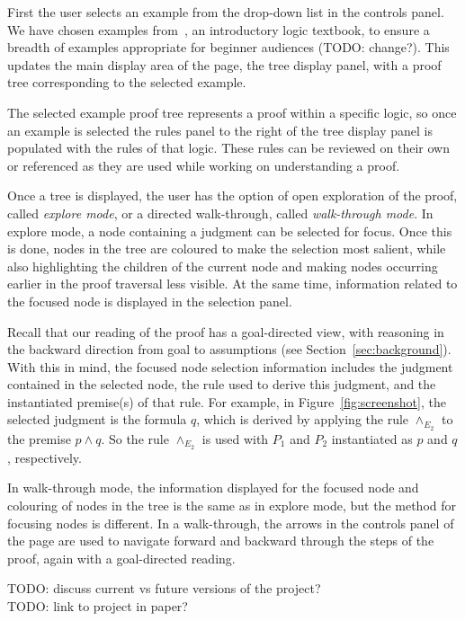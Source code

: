 \documentclass[conference]{IEEEtran}
\begin{document}
First the user selects an example from the drop-down list in the controls panel. We have chosen examples from~\cite{logicincs-huth+ryan}, an introductory logic textbook, to ensure a breadth of examples appropriate for beginner audiences (TODO: change?). This updates the main display area of the page, the tree display panel, with a proof tree corresponding to the selected example.

The selected example proof tree represents a proof within a specific logic, so once an example is selected the rules panel to the right of the tree display panel is populated with the rules of that logic. These rules can be reviewed on their own or referenced as they are used while working on understanding a proof.

Once a tree is displayed, the user has the option of open exploration of the proof, called \textit{explore mode}, or a directed walk-through, called \textit{walk-through mode}. In explore mode, a node containing a judgment can be selected for focus. Once this is done, nodes in the tree are coloured to make the selection most salient, while also highlighting the children of the current node and making nodes occurring earlier in the proof traversal less visible. At the same time, information related to the focused node is displayed in the selection panel.

Recall that our reading of the proof has a goal-directed view, with reasoning in the backward direction from goal to assumptions (see Section~\ref{sec:background}). With this in mind, the focused node selection information includes the judgment contained in the selected node, the rule used to derive this judgment, and the instantiated premise(s) of that rule. For example, in Figure~\ref{fig:screenshot}, the selected judgment is the formula $q$, which is derived by applying the rule $\wedge_{E_2}$ to the premise $p \wedge q$. So the rule $\wedge_{E_2}$ is used with $P_1$ and $P_2$ instantiated as $p$ and $q$, respectively.

In walk-through mode, the information displayed for the focused node and colouring of nodes in the tree is the same as in explore mode, but the method for focusing nodes is different. In a walk-through, the arrows in the controls panel of the page are used to navigate forward and backward through the steps of the proof, again with a goal-directed reading.

TODO: discuss current vs future versions of the project? \\

TODO: link to project in paper? \\
\end{document}
